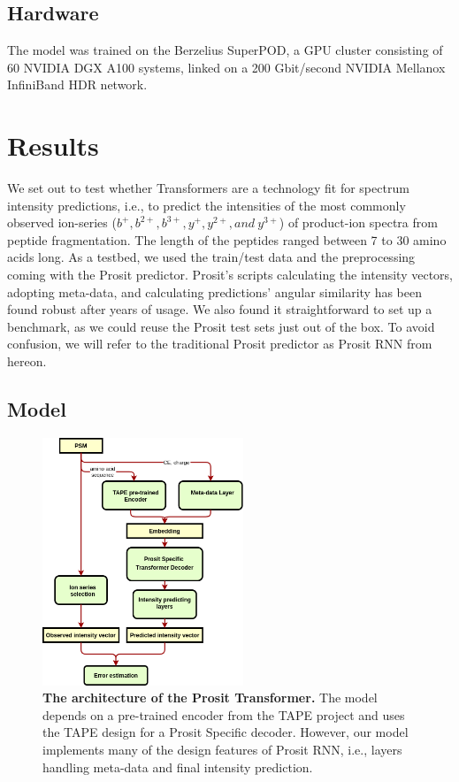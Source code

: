 \documentclass[10pt,a4paper]{article}
\begin{document}
\subsection*{Hardware}

The model was trained on the Berzelius SuperPOD, a GPU cluster consisting of 60 NVIDIA DGX A100 systems, linked on a 200 Gbit/second NVIDIA Mellanox InfiniBand HDR network.

\section*{Results}
We set out to test whether Transformers are a technology fit for spectrum intensity predictions, i.e., to predict the intensities of the most commonly observed ion-series ($b^+, b^{2+}, b^{3+}, y^{+}, y^{2+}, and\ y^{3+}$) of product-ion spectra from peptide fragmentation. The length of the peptides ranged between 7 to 30  amino acids long. As a testbed, we used the train/test data and the preprocessing coming with the Prosit predictor. Prosit’s scripts calculating the intensity vectors, adopting meta-data, and calculating predictions’ angular similarity has been found robust after years of usage. We also found it straightforward to set up a benchmark, as we could reuse the Prosit test sets just out of the box. To avoid confusion, we will refer to the traditional Prosit predictor as Prosit RNN from hereon.

\subsection*{Model}

\begin{figure}[htb!]
    \centering
    \includegraphics[width=6cm]{./img/architecture.png}
    \caption{{\bf The architecture of the Prosit Transformer.} The model depends on a pre-trained encoder from the TAPE project and uses the TAPE design for a Prosit Specific decoder. However, our model implements many of the design features of Prosit RNN, i.e., layers handling meta-data and final intensity prediction. \label{fig:architecture}}
\end{figure}
    
\end{document}
